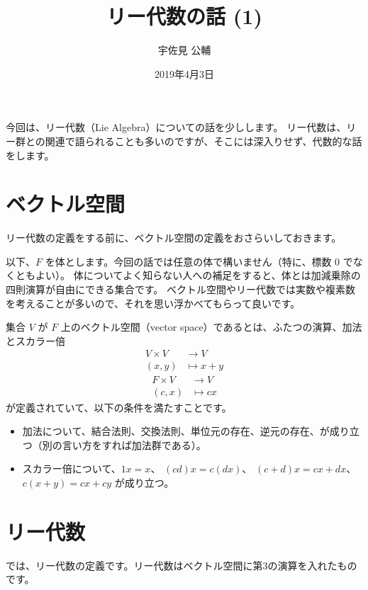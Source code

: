 \documentclass{ltjsarticle}
\title{リー代数の話 (1)}
\author{宇佐見 公輔}
\date{2019年4月3日}
\begin{document}
\maketitle

今回は、リー代数（Lie Algebra）についての話を少しします。
リー代数は、リー群との関連で語られることも多いのですが、そこには深入りせず、代数的な話をします。

\section{ベクトル空間}

リー代数の定義をする前に、ベクトル空間の定義をおさらいしておきます。

以下、\(F\) を体とします。今回の話では任意の体で構いません（特に、標数 \(0\) でなくともよい）。
体についてよく知らない人への補足をすると、体とは加減乗除の四則演算が自由にできる集合です。
ベクトル空間やリー代数では実数や複素数を考えることが多いので、それを思い浮かべてもらって良いです。

\begin{usmdefinition}[ベクトル空間]
    集合 \(V\) が \(F\) 上のベクトル空間（vector space）であるとは、ふたつの演算、加法とスカラー倍
    \begin{align*}
        V \times V & \to V         \\
        (x, y)     & \mapsto x + y
    \end{align*}
    \begin{align*}
        F \times V & \to V      \\
        (c, x)     & \mapsto cx
    \end{align*}
    が定義されていて、以下の条件を満たすことです。
    \begin{itemize}
        \item 加法について、結合法則、交換法則、単位元の存在、逆元の存在、が成り立つ（別の言い方をすれば加法群である）。
        \item スカラー倍について、\(1x = x\)、 \((cd)x = c(dx)\)、 \((c + d)x = cx + dx\)、 \(c(x + y) = cx + cy\)
              が成り立つ。
    \end{itemize}
\end{usmdefinition}

\section{リー代数}

では、リー代数の定義です。リー代数はベクトル空間に第3の演算を入れたものです。
\end{document}
